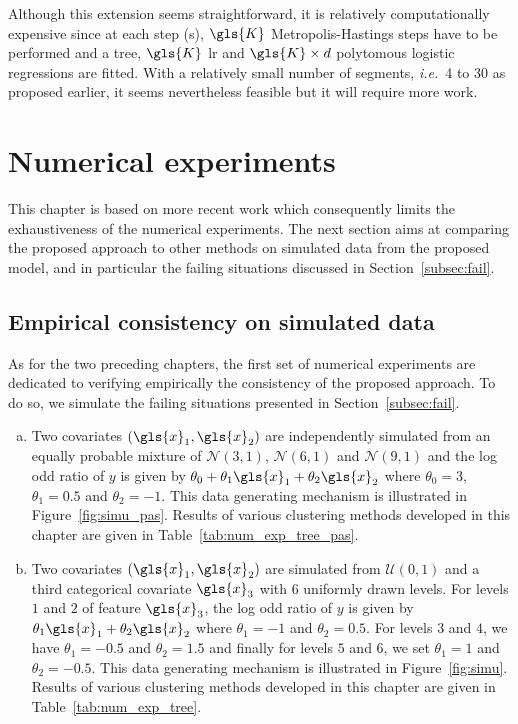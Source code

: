 Although this extension seems straightforward, it is relatively computationally expensive since at each step (s), $\gls{K}$ Metropolis-Hastings steps have to be performed and a tree, $\gls{K}$ \gls{lr} and $\gls{K} \times d$ polytomous logistic regressions are fitted. With a relatively small number of segments, \textit{i.e.}\ 4 to 30 as proposed earlier, it seems nevertheless feasible but it will require more work.

\section{Numerical experiments} \label{sec:num_exp}

This chapter is based on more recent work which consequently limits the exhaustiveness of the numerical experiments. The next section aims at comparing the proposed approach to other methods on simulated data from the proposed model, and in particular the failing situations discussed in Section~\ref{subsec:fail}.

\subsection{Empirical consistency on simulated data} \label{subsec:num_sim}

As for the two preceding chapters, the first set of numerical experiments are dedicated to verifying empirically the consistency of the proposed approach. To do so, we simulate the failing situations presented in Section~\ref{subsec:fail}.

\begin{enumerate}[(a)]
\item Two covariates $(\gls{x}_1,\gls{x}_2)$ are independently simulated from an equally probable mixture of $\mathcal{N}(3,1)$, $\mathcal{N}(6,1)$ and $\mathcal{N}(9,1)$ and the log odd ratio of $y$ is given by $\theta_0 + \theta_1 \gls{x}_1 + \theta_2 \gls{x}_2$ where $\theta_0 = 3$, $\theta_1 = 0.5$ and $\theta_2 = -1$. This data generating mechanism is illustrated in Figure~\ref{fig:simu_pas}. Results of various clustering methods developed in this chapter are given in Table~\ref{tab:num_exp_tree_pas}.
\item Two covariates $(\gls{x}_1,\gls{x}_2)$ are simulated from $\mathcal{U}(0,1)$ and a third categorical covariate $\gls{x}_3$ with 6 uniformly drawn levels. For levels $1$ and $2$ of feature $\gls{x}_3$, the log odd ratio of $y$ is given by $\theta_1 \gls{x}_1 + \theta_2 \gls{x}_2$ where $\theta_1 = -1$ and $\theta_2 = 0.5$. For levels $3$ and $4$, we have $\theta_1 = -0.5$ and $\theta_2 = 1.5$ and finally for levels $5$ and $6$, we set $\theta_1 = 1$ and $\theta_2 = -0.5$. This data generating mechanism is illustrated in Figure~\ref{fig:simu}. Results of various clustering methods developed in this chapter are given in Table~\ref{tab:num_exp_tree}.
\end{enumerate}

